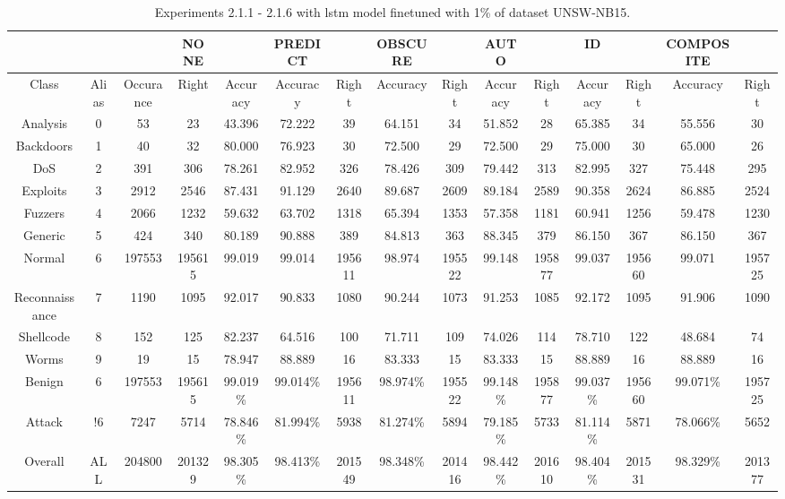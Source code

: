 \begin{table}[htb]
    \centering
    \caption{Experiments 2.1.1 - 2.1.6 with \gls{lstm} model finetuned with 1\% of dataset UNSW-NB15.}
    \label{table:results:lstm:flows15_10}
    \begin{tabular}{@{}ccccccccccccccc@{}}
        \toprule
         &  &  & NONE &  & PREDICT &  & OBSCURE &  & AUTO &  & ID &  & COMPOSITE &  \\
        \midrule
        Class &  Alias &  Occurance &  Right &  Accuracy &  Accuracy &  Right &  Accuracy &  Right &  Accuracy &  Right &  Accuracy &  Right &  Accuracy &  Right \\
        Analysis &  0 &  53 &  23 &  43.396 &  72.222 &  39 &  64.151 &  34 &  51.852 &  28 &  65.385 &  34 &  55.556 &  30 \\
        Backdoors &  1 &  40 &  32 &  80.000 &  76.923 &  30 &  72.500 &  29 &  72.500 &  29 &  75.000 &  30 &  65.000 &  26 \\
        DoS &  2 &  391 &  306 &  78.261 &  82.952 &  326 &  78.426 &  309 &  79.442 &  313 &  82.995 &  327 &  75.448 &  295 \\
        Exploits &  3 &  2912 &  2546 &  87.431 &  91.129 &  2640 &  89.687 &  2609 &  89.184 &  2589 &  90.358 &  2624 &  86.885 &  2524 \\
        Fuzzers &  4 &  2066 &  1232 &  59.632 &  63.702 &  1318 &  65.394 &  1353 &  57.358 &  1181 &  60.941 &  1256 &  59.478 &  1230 \\
        Generic &  5 &  424 &  340 &  80.189 &  90.888 &  389 &  84.813 &  363 &  88.345 &  379 &  86.150 &  367 &  86.150 &  367 \\
        Normal &  6 &  197553 &  195615 &  99.019 &  99.014 &  195611 &  98.974 &  195522 &  99.148 &  195877 &  99.037 &  195660 &  99.071 &  195725 \\
        Reconnaissance &  7 &  1190 &  1095 &  92.017 &  90.833 &  1080 &  90.244 &  1073 &  91.253 &  1085 &  92.172 &  1095 &  91.906 &  1090 \\
        Shellcode &  8 &  152 &  125 &  82.237 &  64.516 &  100 &  71.711 &  109 &  74.026 &  114 &  78.710 &  122 &  48.684 &  74 \\
        Worms &  9 &  19 &  15 &  78.947 &  88.889 &  16 &  83.333 &  15 &  83.333 &  15 &  88.889 &  16 &  88.889 &  16 \\
        Benign &  6 &  197553 &  195615 &  99.019\% &  99.014\% &  195611 &  98.974\% &  195522 &  99.148\% &  195877 &  99.037\% &  195660 &  99.071\% &  195725 \\
        Attack &  !6 &  7247 &  5714 &  78.846\% &  81.994\% &  5938 &  81.274\% &  5894 &  79.185\% &  5733 &  81.114\% &  5871 &  78.066\% &  5652 \\
        Overall &  ALL &  204800 &  201329 &  98.305\% &  98.413\% &  201549 &  98.348\% &  201416 &  98.442\% &  201610 &  98.404\% &  201531 &  98.329\% &  201377 \\
        \bottomrule
    \end{tabular}
\end{table}